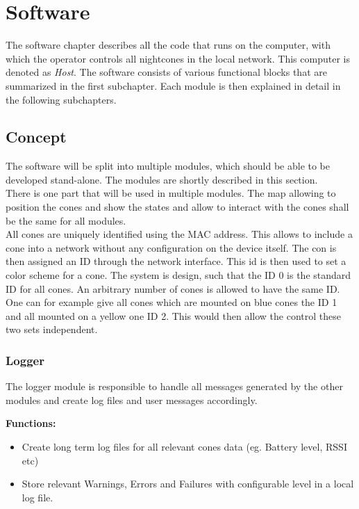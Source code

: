 \section{Software}
The software chapter describes all the code that runs on the computer, with which the operator controls all nightcones in the local network. This computer is denoted as \textit{Host}.  The software consists of various functional blocks that are summarized in the first subchapter. Each module is then explained in detail in the following subchapters. 
\subsection{Concept}
The software will be split into multiple modules, which should be able to be developed stand-alone. The modules are shortly described in this section. \\

There is one part that will be used in multiple modules. The map allowing to position the cones and show the states and allow to interact with the cones shall be the same for all modules. \\

All cones are uniquely identified using the \ac{MAC} address. This allows to include a cone into a network without any configuration on the device itself. The con is then assigned an ID through the network interface. This id is then used to set a color scheme for a cone. The system is design, such that the ID \num{0} is the standard ID for all cones. An arbitrary number of cones is allowed to have the same ID. One can for example give all cones which are mounted on blue cones the ID 1 and all mounted on a yellow one ID 2. This would then allow the control these two sets independent. 

\subsubsection{Logger}
The logger module is responsible to handle all messages generated by the other modules and create log files and user messages accordingly. 

\textbf{Functions:}
\begin{itemize}
	\item Create long term log files for all relevant cones data (eg. Battery level, \ac{RSSI} etc)
	\item Store relevant Warnings, Errors and Failures with configurable level in a local log file. 
\end{itemize}

